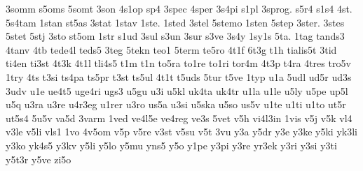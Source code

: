 {3somm
s5oms
5somt
3son
4s1op
sp4
3spec
4sper
3s4pi
s1pl
3sprog.
s5r4
s1s4
4st.
5s4tam
1stan
st5as
3stat
1stav
1ste.
1sted
3stel
5stemo
1sten
5step
3ster.
3stes
5stet
5stj
3sto
st5om
1str
s1ud
3sul
s3un
3sur
s3ve
3s4y
1sy1s
5ta.
1tag
tands3
4tanv
4tb
tede4l
teds5
3teg
5tekn
teo1
5term
te5ro
4t1f
6t3g
t1h
tialis5t
3tid
ti4en
ti3st
4t3k
4t1l
tli4s5
t1m
t1n
to5ra
to1re
to1ri
tor4m
4t3p
t4ra
4tres
tro5v
1try
4ts
t3si
ts4pa
ts5pr
t3st
ts5ul
4t1t
t5uds
5tur
t5ve
1typ
u1a
5udl
ud5r
ud3s
3udv
u1e
ue4t5
uge4ri
ugs3
u5gu
u3i
u5kl
uk4ta
uk4tr
u1la
u1le
u5ly
u5pe
up5l
u5q
u3ra
u3re
u4r3eg
u1rer
u3ro
us5a
u3si
u5ska
u5so
us5v
u1te
u1ti
u1to
ut5r
ut5s4
5u5v
va5d
3varm
1ved
ve4l5e
ve4reg
ve3s
5vet
v5h
vi4l3in
1vis
v5j
v5k
vl4
v3le
v5li
vls1
1vo
4v5om
v5p
v5re
v3st
v5su
v5t
3vu
y3a
y5dr
y3e
y3ke
y5ki
yk3li
y3ko
yk4s5
y3kv
y5li
y5lo
y5mu
yns5
y5o
y1pe
y3pi
y3re
yr3ek
y3ri
y3si
y3ti
y5t3r
y5ve
zi5o
}
\endinput
%
%
\patterns{ %
.sZ3
.Xr5i
.Yv3r
a3tY
a5vX
brYd3
5bX
5drYv
dstZ4
3dX
3dY
e3lX
e3lY
e3rY
er5Yn
e5tX
e5tY
e1vX
e3X
e5Z
3fX
3fY
fY4r5en
giY4
g4sY
g5sZ
3gX
3gY1
3gZ
i5tX
i3Y
3kY
3kZ
lingeniY4
l3vX
5lYs
m5tZ
1mX
3mY
3mZ
n3kX
n5tX
3nX
4n5Xb
5nY
o5lX
or3Y
o5Z
5prX
5pXd
pZ3
r5kX
r5tX
r5tY
r3vX
r5Xl
4rYn
5rYr
3rZd
r5Zr
s4kZ
3slZ
s4nX
5stY
1stZ
1sX
4s5Xn
1sY
s5Yk
sZ4r5
ti4Y
3trXk.
t4sY
t5sZ
t3vX
u3lX
3vXrd
1vXrk
5vZ
y5vX
Xb3l
X3c
X3e
Xg5a
X4gek
X4g5r
Xgs5
X5i
X5kv
Xlle4
Xn1dr
X5o
X1re
Xr4g5r
X3ri
Xr4ma
Xr4mo
Xr5s
X5si
X3so
X3ste
X3ve
Yde5
Y3e
Y1je
Y3ke
Y3le
Yms5
Yn3st
Yn4t3
Y1re
Y3ri
Yrne3
Yr5o
Y1ve
Z1d
Z1e
Z5h
Z3l
Z3re
Zrs5t
Z5sk
Z3t
}
\endinput
